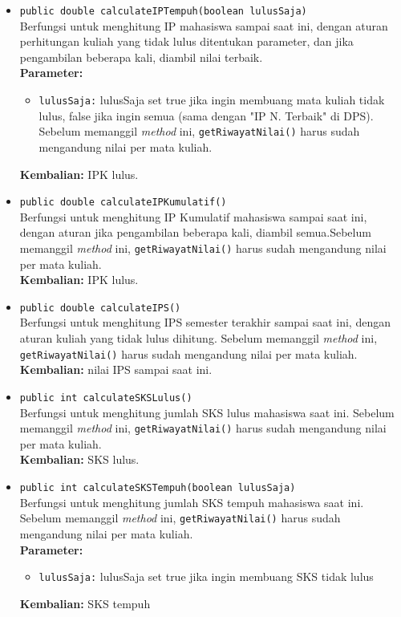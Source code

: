 \begin{itemize}
	\item \texttt{public double calculateIPTempuh(boolean lulusSaja)}\\
	Berfungsi untuk menghitung IP mahasiswa sampai saat ini, dengan aturan perhitungan kuliah yang tidak lulus ditentukan parameter, dan jika pengambilan beberapa kali, diambil nilai terbaik.\\
        \textbf{Parameter:}
		\begin{itemize}
			\item \texttt{lulusSaja:} lulusSaja set true jika ingin membuang mata kuliah tidak lulus, false jika ingin semua (sama dengan "IP N. Terbaik" di DPS). Sebelum memanggil \textit{method} ini, \texttt{getRiwayatNilai()} harus sudah mengandung nilai per mata kuliah.
		\end{itemize}
		\textbf{Kembalian:} IPK lulus.
		
	\item \texttt{public double calculateIPKumulatif()}\\
	Berfungsi untuk menghitung IP Kumulatif mahasiswa sampai saat ini, dengan aturan jika pengambilan beberapa kali, diambil semua.Sebelum memanggil \textit{method} ini, \texttt{getRiwayatNilai()} harus sudah mengandung nilai per mata kuliah.\\
		\textbf{Kembalian:} IPK lulus.
		
	\item \texttt{public double calculateIPS()}\\
		Berfungsi untuk menghitung IPS semester terakhir sampai saat ini, dengan aturan kuliah yang tidak lulus dihitung. Sebelum memanggil \textit{method} ini, \texttt{getRiwayatNilai()} harus sudah mengandung nilai per mata kuliah.\\
		\textbf{Kembalian:}  nilai IPS sampai saat ini.
		
	\item \texttt{public int calculateSKSLulus()}\\
		Berfungsi untuk menghitung jumlah SKS lulus mahasiswa saat ini. Sebelum memanggil \textit{method} ini, \texttt{getRiwayatNilai()} harus sudah mengandung nilai per mata kuliah.\\
		\textbf{Kembalian:} SKS lulus.
		
	\item \texttt{public int calculateSKSTempuh(boolean lulusSaja)}\\
		Berfungsi untuk menghitung jumlah SKS tempuh mahasiswa saat ini. Sebelum memanggil \textit{method} ini, \texttt{getRiwayatNilai()} harus sudah mengandung nilai per mata kuliah.\\
        \textbf{Parameter:}
		\begin{itemize}
			\item \texttt{lulusSaja:} lulusSaja set true jika ingin membuang SKS tidak lulus
		\end{itemize}
		\textbf{Kembalian:} SKS tempuh
		

\end{itemize}
